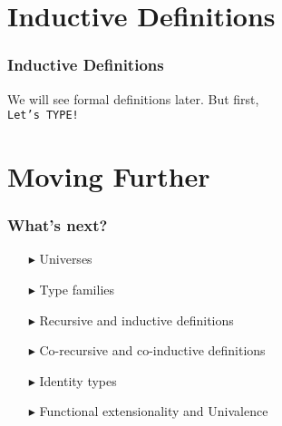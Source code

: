 \documentclass[14pt,compress]{beamer}
\begin{document}
\section{Inductive Definitions}
\begin{frame}\label{frame : Inductive definitions}
\frametitle{Inductive Definitions}
\pause
We will see formal definitions later. But first,
\pause
\\
\textcolor{beamer@mathtext}{
\texttt{Let's TYPE!}}
\end{frame}
\section{Moving Further}
\begin{frame}\label{frame : what's next}
\frametitle{What's next?}
\begin{enumerate}
\item[$\blacktriangleright$] Universes
\item[$\blacktriangleright$] Type families
\item[$\blacktriangleright$] Recursive and inductive definitions
\item[$\blacktriangleright$] Co-recursive and co-inductive definitions
\item[$\blacktriangleright$] Identity types
\item[$\blacktriangleright$] Functional extensionality and Univalence
\end{enumerate}

\end{frame}
\end{document}
